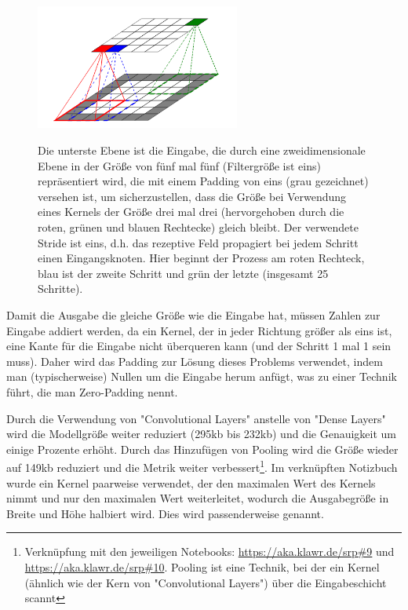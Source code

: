 \begin{figure}
    \centering
    \caption{  Die unterste Ebene ist die Eingabe, die durch eine zweidimensionale Ebene in der Größe von fünf mal fünf (Filtergröße ist eins) repräsentiert wird, die mit einem Padding von eins (grau gezeichnet) versehen ist, um sicherzustellen, dass die Größe bei Verwendung eines Kernels der Größe drei mal drei (hervorgehoben durch die roten, grünen und blauen Rechtecke) gleich bleibt. Der verwendete Stride ist eins, d.h. das rezeptive Feld propagiert bei jedem Schritt einen Eingangsknoten. Hier beginnt der Prozess am roten Rechteck, blau ist der zweite Schritt und grün der letzte (insgesamt 25 Schritte). }
    \includegraphics[width=0.6\textwidth]{images/conv_layer.png}
    \label{fig:conv_layer}
\end{figure}

Damit die Ausgabe die gleiche Größe wie die Eingabe hat, müssen Zahlen zur Eingabe addiert werden, da ein Kernel, der in jeder Richtung größer als eins ist, eine Kante für die Eingabe nicht überqueren kann (und der Schritt 1 mal 1 sein muss).
Daher wird das Padding zur Lösung dieses Problems verwendet, indem man (typischerweise) Nullen um die Eingabe herum anfügt, was zu einer Technik führt, die man Zero-Padding nennt.

Durch die Verwendung von "Convolutional Layers" anstelle von "Dense Layers" wird die Modellgröße weiter reduziert (295kb bis 232kb) und die Genauigkeit um einige Prozente erhöht. Durch das Hinzufügen von Pooling wird die Größe wieder auf 149kb reduziert und die Metrik weiter verbessert\footnote{Verknüpfung mit den jeweiligen Notebooks: \url{https://aka.klawr.de/srp\#9} und \url{https://aka.klawr.de/srp\#10}.
Pooling ist eine Technik, bei der ein Kernel (ähnlich wie der Kern von "Convolutional Layers") über die Eingabeschicht scannt}.
Im verknüpften Notizbuch wurde ein Kernel paarweise verwendet, der den maximalen Wert des Kernels nimmt und nur den maximalen Wert weiterleitet, wodurch die Ausgabegröße in Breite und Höhe halbiert wird.
Dies wird passenderweise  genannt.

